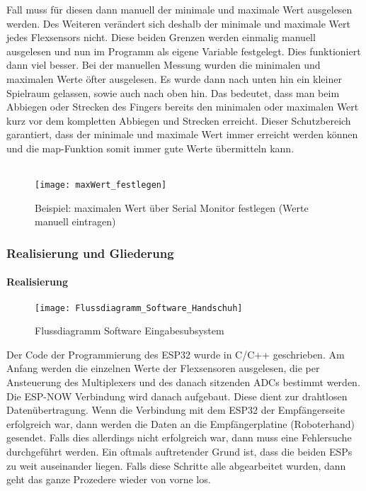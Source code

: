 \documentclass[titlepage,12pt,twoside]{article}
\begin{document}
Fall muss für diesen dann manuell der minimale und maximale Wert ausgelesen werden. 
Des Weiteren verändert sich deshalb der minimale und maximale Wert jedes Flexsensors 
nicht. Diese beiden Grenzen werden einmalig manuell ausgelesen und nun im Programm 
als eigene Variable festgelegt. Dies funktioniert dann viel besser. Bei der manuellen 
Messung wurden die minimalen und maximalen Werte öfter ausgelesen. Es wurde dann 
nach unten hin ein kleiner Spielraum gelassen, sowie auch nach oben hin. Das bedeutet, 
dass man beim Abbiegen oder Strecken des Fingers bereits den minimalen oder maximalen 
Wert kurz vor dem kompletten Abbiegen und Strecken erreicht. Dieser Schutzbereich 
garantiert, dass der minimale und maximale Wert immer erreicht werden können und die 
map-Funktion somit immer gute Werte übermitteln kann. \\
\\
\begin{figure}[H]
	\begin{center}
		\scalebox{0.7}
		{\texttt{[image: maxWert\_festlegen]}}
		\caption{Beispiel: maximalen Wert über Serial Monitor festlegen (Werte manuell eintragen)}
		\label{fig:maxWert_festlegen}			
	\end{center}
\end{figure}
\hfill \break
\newpage
\subsubsection{Realisierung und Gliederung}
\paragraph{Realisierung}
\hfill \break
\hfill \break
\begin{figure}[H]
	\begin{center}
		\scalebox{0.5}
		{\texttt{[image: Flussdiagramm\_Software\_Handschuh]}}
		\caption{Flussdiagramm Software Eingabesubsystem}
		\label{fig:Flussdiagramm_Software_Handschuh}			
	\end{center}
\end{figure}
\hfill \break
Der Code der Programmierung des ESP32 wurde in C/C++ geschrieben. Am Anfang werden die einzelnen Werte der Flexsensoren 
ausgelesen, die per Ansteuerung des Multiplexers und des danach sitzenden ADCs bestimmt werden. Die ESP-NOW Verbindung wird 
danach aufgebaut. Diese dient zur drahtlosen Datenübertragung. Wenn die Verbindung mit dem ESP32 der Empfängerseite erfolgreich 
war, dann werden die Daten an die Empfängerplatine (Roboterhand) gesendet. Falls dies allerdings nicht erfolgreich war, dann 
muss eine Fehlersuche durchgeführt werden. Ein oftmals auftretender Grund ist, dass die beiden ESPs zu weit auseinander liegen. 
Falls diese Schritte alle abgearbeitet wurden, dann geht das ganze Prozedere wieder von vorne los. \\
\\
\end{document}

